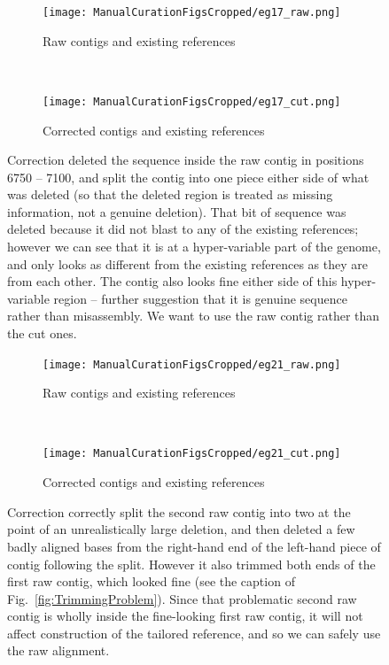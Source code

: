 \documentclass{article}
\begin{document}
\begin{landscape}
\begin{figure}[!h]
\centering
\begin{subfigure}{1.3\textwidth}
\texttt{[image: ManualCurationFigsCropped/eg17\_raw.png]}
\caption{Raw contigs and existing references}
\end{subfigure}
\vspace*{1cm} \\
\begin{subfigure}{1.3\textwidth}
\texttt{[image: ManualCurationFigsCropped/eg17\_cut.png]}
\caption{Corrected contigs and existing references}
\end{subfigure}
\caption{Correction deleted the sequence inside the raw contig in positions 6750 -- 7100, and split the contig into one piece either side of what was deleted (so that the deleted region is treated as missing information, not a genuine deletion).
That bit of sequence was deleted because it did not blast to any of the existing references; however we can see that it is at a hyper-variable part of the genome, and only looks as different from the existing references as they are from each other.
The contig also looks fine either side of this hyper-variable region -- further suggestion that it is genuine sequence rather than misassembly.
We want to use the raw contig rather than the cut ones.}
\end{figure}

\begin{figure}[!h]
\centering
\begin{subfigure}{1.3\textwidth}
\texttt{[image: ManualCurationFigsCropped/eg21\_raw.png]}
\caption{Raw contigs and existing references}
\end{subfigure}
\vspace*{1cm} \\
\begin{subfigure}{1.3\textwidth}
\texttt{[image: ManualCurationFigsCropped/eg21\_cut.png]}
\caption{Corrected contigs and existing references}
\end{subfigure}
\caption{Correction correctly split the second raw contig into two at the point of an unrealistically large deletion, and then deleted a few badly aligned bases from the right-hand end of the left-hand piece of contig following the split.
However it also trimmed both ends of the first raw contig, which looked fine (see the caption of Fig.~\ref{fig:TrimmingProblem}).
Since that problematic second raw contig is wholly inside the fine-looking first raw contig, it will not affect construction of the tailored reference, and so we can safely use the raw alignment.}
\end{figure}


\end{landscape}
\end{document}
